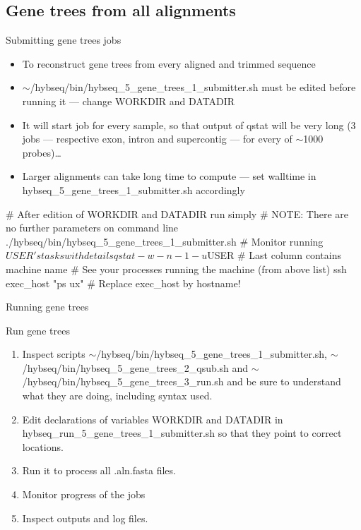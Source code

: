 \documentclass[compress, ucs, xelatex, 11pt, xcolor=x11names, aspectratio=169,
	hyperref={
		bookmarks=true,
		unicode=true,
		colorlinks=true,
		pdftitle={HybSeq course},
		plainpages=false,
		pdfauthor={Vojtech Zeisek},
		pdfsubject={Practical processing of HybSeq target enrichment sequencing data on computing grids like MetaCentrum},
		pdfcreator={XeLaTeX},
		pdfkeywords={BASH, command line, GNU, HybSeq, Linux, MetaCentrum, sequencing shell, target enrichment},
		linkcolor=Turquoise4, %
		anchorcolor=DodgerBlue4, %
		citecolor=DodgerBlue4, %
		filecolor=DodgerBlue4, %
		menucolor=Tan4, %
		urlcolor=DarkOliveGreen4, %
		pdftex},
	url={hyphens, lowtilde} %
	]{beamer}
\renewcommand{\texttt}[1]{\colorbox{Cornsilk2}{{\ttfamily #1}}}
\renewcommand{\alert}[1]{\textcolor{OrangeRed3}{#1}}
\begin{document}
\subsection{Gene trees from all alignments}

\begin{frame}[fragile]{Submitting gene trees jobs}
	\begin{itemize}
		\item To reconstruct gene trees from every aligned and trimmed sequence
		\item \alert{\texttt{$\sim$/hybseq/bin/hybseq\_5\_gene\_trees\_1\_submitter.sh} must be edited before running it --- change \texttt{WORKDIR} and \texttt{DATADIR}}
		\item It will start job for every sample, so that output of \texttt{qstat} will be very long (3 jobs --- respective exon, intron and supercontig --- for every of $\sim$1000 probes)\ldots
		\item Larger alignments can take long time to compute --- set \texttt{walltime} in \texttt{hybseq\_5\_gene\_trees\_1\_submitter.sh} accordingly
	\end{itemize}
	\begin{bashcode}
    # After edition of WORKDIR and DATADIR run simply
    # NOTE: There are no further parameters on command line
    ./hybseq/bin/hybseq_5_gene_trees_1_submitter.sh
    # Monitor running $USER's tasks with details
    qstat -w -n -1 -u $USER # Last column contains machine name
    # See your processes running the machine (from above list)
    ssh exec_host "ps ux" # Replace exec_host by hostname!
	\end{bashcode}
\end{frame}

\begin{frame}{Running gene trees}
	\begin{exampleblock}{Run gene trees}
		\begin{enumerate}
			\item Inspect scripts \texttt{$\sim$/hybseq/bin/hybseq\_5\_gene\_trees\_1\_submitter.sh}, \texttt{$\sim$/hybseq/bin/hybseq\_5\_gene\_trees\_2\_qsub.sh} and \texttt{$\sim$/hybseq/bin/hybseq\_5\_gene\_trees\_3\_run.sh} and be sure to understand what they are doing, including syntax used.
			\item Edit declarations of variables \texttt{WORKDIR} and \texttt{DATADIR} in \texttt{hybseq\_run\_5\_gene\_trees\_1\_submitter.sh} so that they point to correct locations.
			\item Run it to process all \texttt{*.aln.fasta} files.
			\item Monitor progress of the jobs
			\item Inspect outputs and log files.
		\end{enumerate}
	\end{exampleblock}
\end{frame}
\end{document}
